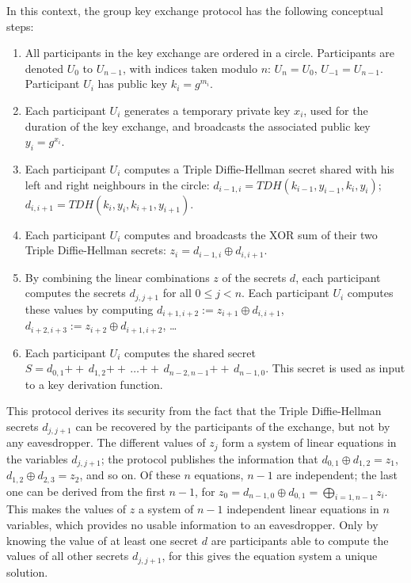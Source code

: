 \documentclass{article}
\def\concat{\mathbin{+\!\!\!+\,}}
\def\xor{\oplus}
\begin{document}
In this context, the group key exchange protocol has the following conceptual steps:
\begin{enumerate}
\item All participants in the key exchange are ordered in a circle. Participants are denoted $U_0$ to $U_{n-1}$, with indices taken modulo $n$: $U_n = U_0$, $U_{-1} = U_{n-1}$. Participant $U_i$ has public key $k_i = g^{m_i}$.
\item Each participant $U_i$ generates a temporary private key $x_i$, used for the duration of the key exchange, and broadcasts the associated public key $y_i = g^{x_i}$.
\item Each participant $U_i$ computes a Triple Diffie-Hellman secret shared with his left and right neighbours in the circle: $d_{i-1, i} = TDH(k_{i-1}, y_{i-1}, k_i, y_i)$; $d_{i, i+1} = TDH(k_i, y_i, k_{i+1}, y_{i+1})$.
\item Each participant $U_i$ computes and broadcasts the XOR sum of their two Triple Diffie-Hellman secrets: $z_i = d_{i-1, i} \xor d_{i, i+1}$.
\item By combining the linear combinations $z$ of the secrets $d$, each participant computes the secrets $d_{j, j+1}$ for all $0 \leq j < n$. Each participant $U_i$ computes these values by computing $d_{i+1, i+2} := z_{i+1} \xor d_{i, i+1}$, $d_{i+2, i+3} := z_{i+2} \xor d_{i+1, i+2}$, \ldots
\item Each participant $U_i$ computes the shared secret $S = d_{0, 1} \concat d_{1, 2} \concat \ldots \concat d_{n-2, n-1} \concat d_{n-1, 0}$. This secret is used as input to a key derivation function.
\end{enumerate}

This protocol derives its security from the fact that the Triple Diffie-Hellman secrets $d_{j, j+1}$ can be recovered by the participants of the exchange, but not by any eavesdropper.
The different values of $z_j$ form a system of linear equations in the variables $d_{j, j+1}$; the protocol publishes the information that $d_{0, 1} \xor d_{1, 2} = z_{1}$, $d_{1, 2} \xor d_{2, 3} = z_2$, and so on.
Of these $n$ equations, $n - 1$ are independent; the last one can be derived from the first $n - 1$, for $z_0 = d_{n-1, 0} \xor d_{0, 1} = \bigoplus_{i=1, n-1} z_i$.
This makes the values of $z$ a system of $n - 1$ independent linear equations in $n$ variables, which provides no usable information to an eavesdropper.
Only by knowing the value of at least one secret $d$ are participants able to compute the values of all other secrets $d_{j, j+1}$, for this gives the equation system a unique solution.
\end{document}
